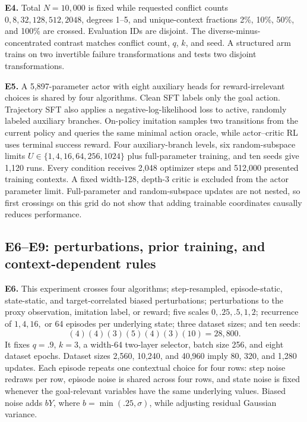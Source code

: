 \textbf{E4.} Total $N=10,000$ is fixed while requested conflict counts $0,8,32,128,512,2048$, degrees 1--5, and unique-context fractions 2\%, 10\%, 50\%, and 100\% are crossed. Evaluation IDs are disjoint. The diverse-minus-concentrated contrast matches conflict count, $q$, $k$, and seed. A structured arm trains on two invertible failure transformations and tests two disjoint transformations.

\textbf{E5.} A 5,897-parameter actor with eight auxiliary heads for reward-irrelevant choices is shared by four algorithms. Clean SFT labels only the goal action. Trajectory SFT also applies a negative-log-likelihood loss to active, randomly labeled auxiliary branches. On-policy imitation samples two transitions from the current policy and queries the same minimal action oracle, while actor--critic RL uses terminal success reward. Four auxiliary-branch levels, six random-subspace limits $U\in\{1,4,16,64,256,1024\}$ plus full-parameter training, and ten seeds give 1,120 runs. Every condition receives 2,048 optimizer steps and 512,000 presented training contexts. A fixed width-128, depth-3 critic is excluded from the actor parameter limit. Full-parameter and random-subspace updates are not nested, so first crossings on this grid do not show that adding trainable coordinates causally reduces performance.

\subsection{E6--E9: perturbations, prior training, and context-dependent rules}

\textbf{E6.} This experiment crosses four algorithms; step-resampled, episode-static, state-static, and target-correlated biased perturbations; perturbations to the proxy observation, imitation label, or reward; five scales $0,.25,.5,1,2$; recurrence of $1,4,16,$ or 64 episodes per underlying state; three dataset sizes; and ten seeds:
\[
(4)(4)(3)(5)(4)(3)(10)=28,800.
\]
It fixes $q=.9$, $k=3$, a width-64 two-layer selector, batch size 256, and eight dataset epochs. Dataset sizes 2,560, 10,240, and 40,960 imply 80, 320, and 1,280 updates. Each episode repeats one contextual choice for four rows: step noise redraws per row, episode noise is shared across four rows, and state noise is fixed whenever the goal-relevant variables have the same underlying values. Biased noise adds $bY$, where $b=\min(.25,\sigma)$, while adjusting residual Gaussian variance.

